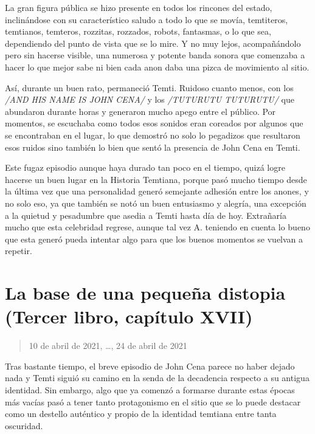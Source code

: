 \documentclass[
  spanish,
]{book}
\begin{document}
La gran figura pública se hizo presente en todos los rincones del estado, inclinándose con su característico saludo a todo lo que se movía, temtiteros, temtianos, temteros, rozzitas, rozzados, robots, fantasmas, o lo que sea, dependiendo del punto de vista que se lo mire. Y no muy lejos, acompañándolo pero sin hacerse visible, una numerosa y potente banda sonora que comenzaba a hacer lo que mejor sabe ni bien cada anon daba una pizca de movimiento al sitio.

Así, durante un buen rato, permaneció Temti. Ruidoso cuanto menos, con los \emph{/AND HIS NAME IS JOHN CENA/} y los \emph{/TUTURUTU TUTURUTU/} que abundaron durante horas y generaron mucho apego entre el público. Por momentos, se escuchaba como todos esos sonidos eran coreados por algunos que se encontraban en el lugar, lo que demostró no solo lo pegadizos que resultaron esos ruidos sino también lo bien que sentó la presencia de John Cena en Temti.

Este fugaz episodio aunque haya durado tan poco en el tiempo, quizá logre hacerse un buen lugar en la Historia Temtiana, porque pasó mucho tiempo desde la última vez que una personalidad generó semejante adhesión entre los anones, y no solo eso, ya que también se notó un buen entusiasmo y alegría, una excepción a la quietud y pesadumbre que asedia a Temti hasta día de hoy. Extrañaría mucho que esta celebridad regrese, aunque tal vez A. teniendo en cuenta lo bueno que esta generó pueda intentar algo para que los buenos momentos se vuelvan a repetir.

\hypertarget{la-base-de-una-pequeuxf1a-distopia-tercer-libro-capuxedtulo-xvii}{%
\section{La base de una pequeña distopia (Tercer libro, capítulo XVII)}\label{la-base-de-una-pequeuxf1a-distopia-tercer-libro-capuxedtulo-xvii}}

\begin{quote}
10 de abril de 2021, \ldots, 24 de abril de 2021
\end{quote}

Tras bastante tiempo, el breve episodio de John Cena parece no haber dejado nada y Temti siguió su camino en la senda de la decadencia respecto a su antigua identidad. Sin embargo, algo que ya comenzó a formarse durante estas épocas más vacías pasó a tener tanto protagonismo en el sitio que se lo puede destacar como un destello auténtico y propio de la identidad temtiana entre tanta oscuridad.
\end{document}
